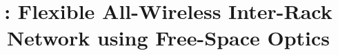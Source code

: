 \documentclass{sig-alternate-10pt}
\begin{document}
\title{\ArchName: Flexible All-Wireless Inter-Rack Network using Free-Space Optics}


\newcommand{\supsym}[1]{\raisebox{4pt}{{\footnotesize #1}}}
\newcommand{\pr}{\supsym{$\ast$}}
\newcommand{\ms}{\supsym{$\dag$}}


\vspace{-1in}
\maketitle



\newcommand{\paraspace}{\vspace{0.05in}}
\newcommand{\paragraphb}[1]{\paraspace\noindent{\bf #1} }
\newcommand{\paragraphe}[1]{\paraspace\noindent{\em #1} }
\newcommand{\paragraphbe}[1]{\paraspace\noindent{\bf \em #1} }



\newcommand{\mySection}{\S}
\newcommand{\Name}{FireFly}
























 







{\scriptsize 


}
\end{document}
